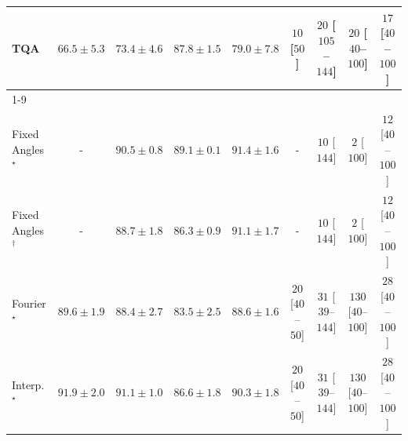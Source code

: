 \begin{tabular}{l|cccc|cccc|}
TQA & {\cellcolor[HTML]{FFFDDD}} \color[HTML]{000000} $66.5\pm 5.3$ & {\cellcolor[HTML]{FEE28E}} \color[HTML]{000000} $73.4\pm 4.6$ & {\cellcolor[HTML]{CD4D03}} \color[HTML]{F1F1F1} $87.8\pm 1.5$ & {\cellcolor[HTML]{FEAB39}} \color[HTML]{000000} $79.0\pm 7.8$ & {\cellcolor[HTML]{FFF6F2}} \color[HTML]{000000} $10$ [$50$] & {\cellcolor[HTML]{FFF3F0}} \color[HTML]{000000} $20$ [$105$--$144$] & {\cellcolor[HTML]{FFF3F0}} \color[HTML]{000000} $20$ [$40$--$100$] & {\cellcolor[HTML]{FFF4F0}} \color[HTML]{000000} $17$ [$40$--$100$] \\
\cline{1-9}
\multicolumn{9}{c}{\rule{0pt}{8pt}PP} \\
\midrule
Fixed Angles$^\star$ & {\cellcolor[HTML]{000000}} \color[HTML]{F1F1F1} {\cellcolor{white}} \color{black} - & {\cellcolor[HTML]{0A703A}} \color[HTML]{F1F1F1} $90.5\pm 0.8$ & {\cellcolor[HTML]{177B3F}} \color[HTML]{F1F1F1} $89.1\pm 0.1$ & {\cellcolor[HTML]{016937}} \color[HTML]{F1F1F1} $91.4\pm 1.6$ & {\cellcolor[HTML]{000000}} \color[HTML]{F1F1F1} {\cellcolor{white}} \color{black} - & {\cellcolor[HTML]{FFF6F2}} \color[HTML]{000000} $10$ [$144$] & {\cellcolor[HTML]{FFF7F3}} \color[HTML]{000000} $2$ [$100$] & {\cellcolor[HTML]{FFF5F1}} \color[HTML]{000000} $12$ [$40$--$100$] \\
Fixed Angles$^\dagger$ & {\cellcolor[HTML]{000000}} \color[HTML]{F1F1F1} {\cellcolor{white}} \color{black} - & {\cellcolor[HTML]{1C7E40}} \color[HTML]{F1F1F1} $88.7\pm 1.8$ & {\cellcolor[HTML]{30954F}} \color[HTML]{F1F1F1} $86.3\pm 0.9$ & {\cellcolor[HTML]{056C39}} \color[HTML]{F1F1F1} $91.1\pm 1.7$ & {\cellcolor[HTML]{000000}} \color[HTML]{F1F1F1} {\cellcolor{white}} \color{black} - & {\cellcolor[HTML]{FFF6F2}} \color[HTML]{000000} $10$ [$144$] & {\cellcolor[HTML]{FFF7F3}} \color[HTML]{000000} $2$ [$100$] & {\cellcolor[HTML]{FFF5F1}} \color[HTML]{000000} $12$ [$40$--$100$] \\
Fourier$^\star$ & {\cellcolor[HTML]{13773D}} \color[HTML]{F1F1F1} $89.6\pm 1.9$ & {\cellcolor[HTML]{1E8041}} \color[HTML]{F1F1F1} $88.4\pm 2.7$ & {\cellcolor[HTML]{4CB063}} \color[HTML]{F1F1F1} $83.5\pm 2.5$ & {\cellcolor[HTML]{1D7F41}} \color[HTML]{F1F1F1} $88.6\pm 1.6$ & {\cellcolor[HTML]{FFF3F0}} \color[HTML]{000000} $20$ [$40$--$50$] & {\cellcolor[HTML]{FEF1ED}} \color[HTML]{000000} $31$ [$39$--$144$] & {\cellcolor[HTML]{FDD8D5}} \color[HTML]{000000} $130$ [$40$--$100$] & {\cellcolor[HTML]{FEF1ED}} \color[HTML]{000000} $28$ [$40$--$100$] \\
Interp.$^\star$ & {\cellcolor[HTML]{006536}} \color[HTML]{F1F1F1} $91.9\pm 2.0$ & {\cellcolor[HTML]{056C39}} \color[HTML]{F1F1F1} $91.1\pm 1.0$ & {\cellcolor[HTML]{2E924C}} \color[HTML]{F1F1F1} $86.6\pm 1.8$ & {\cellcolor[HTML]{0C723B}} \color[HTML]{F1F1F1} $90.3\pm 1.8$ & {\cellcolor[HTML]{FFF3F0}} \color[HTML]{000000} $20$ [$40$--$50$] & {\cellcolor[HTML]{FEF1ED}} \color[HTML]{000000} $31$ [$39$--$144$] & {\cellcolor[HTML]{FDD8D5}} \color[HTML]{000000} $130$ [$40$--$100$] & {\cellcolor[HTML]{FEF1ED}} \color[HTML]{000000} $28$ [$40$--$100$] \\

\end{tabular}
